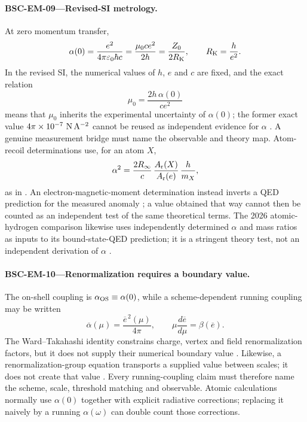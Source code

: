 \documentclass[11pt,a4paper]{article}
\theoremstyle{definition}
\theoremstyle{plain}
\theoremstyle{remark}
\begin{document}
\paragraph{\textbf{BSC-EM-09}---Revised-SI metrology.}
At zero momentum transfer,
\[
\alpha(0)
=\frac{e^2}{4\pi\varepsilon_0\hbar c}
=\frac{\mu_0ce^2}{2h}
=\frac{Z_0}{2R_{\rm K}},
\qquad
R_{\rm K}=\frac h{e^2}.
\]
In the revised SI, the numerical values of \(h\), \(e\) and \(c\) are fixed,
and the exact relation
\[
\mu_0=\frac{2h\,\alpha(0)}{ce^2}
\]
means that \(\mu_0\) inherits the experimental uncertainty of
\(\alpha(0)\); the former exact value
\(4\pi\times10^{-7}\ {\rm N\,A^{-2}}\) cannot be reused as independent
evidence for \(\alpha\) \citep{bipm2019ampere,mohr2025codata}.  A genuine
measurement bridge must name the observable and theory map.  Atom-recoil
determinations use, for an atom \(X\),
\[
\alpha^2
=\frac{2R_\infty}{c}\,
 \frac{A_{\rm r}(X)}{A_{\rm r}(e)}\,
 \frac h{m_X},
\]
as in \citet{morel2020alpha}.  An electron-magnetic-moment determination
instead inverts a QED prediction for the measured anomaly
\citep{fan2023moment}; a value obtained that way cannot then be counted as an
independent test of the same theoretical terms.  The 2026 atomic-hydrogen
comparison likewise uses independently determined \(\alpha\) and mass ratios
as inputs to its bound-state-QED prediction; it is a stringent theory test,
not an independent derivation of \(\alpha\)
\citep{maisenbacher2026hydrogen}.

\paragraph{\textbf{BSC-EM-10}---Renormalization requires a boundary value.}
The on-shell coupling is \(\alpha_{\rm OS}\equiv\alpha(0)\), while a
scheme-dependent running coupling may be written
\[
\overline\alpha(\mu)=\frac{\overline e^{\,2}(\mu)}{4\pi},
\qquad
\mu\frac{d\overline e}{d\mu}=\beta(\overline e).
\]
The Ward--Takahashi identity constrains charge, vertex and field
renormalization factors, but it does not supply their numerical boundary
value \citep{ward1950,takahashi1957}.  Likewise, a renormalization-group
equation transports a supplied value between scales; it does not create that
value \citep{gellmannlow1954}.  Every running-coupling claim must therefore
name the scheme, scale, threshold matching and observable.  Atomic
calculations normally use \(\alpha(0)\) together with explicit radiative
corrections; replacing it naively by a running \(\alpha(\omega)\) can double
count those corrections.
\end{document}
